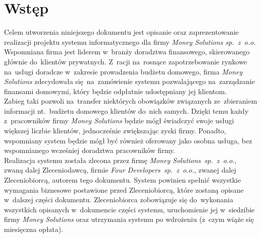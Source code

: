 \section{Wstęp}

Celem utworzenia niniejszego dokumentu jest opisanie oraz zaprezentowanie realizacji projektu systemu informatycznego dla firmy \emph{Money Solutions sp.~z~o.o.} Wspomniana firma jest liderem w~branży doradztwa finansowego, skierowanego głównie do~klientów prywatnych. Z~racji na~rosnące zapotrzebowanie rynkowe na~usługi doradcze w~zakresie prowadzenia budżetu domowego, firma \emph{Money Solutions} zdecydowała się na~zamówienie systemu pozwalającego na~zarządzanie finansami domowymi, który będzie odpłatnie udostępniany jej klientom.\\

Zabieg taki pozwoli na~transfer niektórych obowiązków związanych ze~zbieraniem informacji nt.~budżetu domowego klientów do~nich samych. Dzięki temu każdy z~pracowników firmy \emph{Money Solutions} będzie mógł świadczyć swoje usługi większej liczbie klientów, jednocześnie zwiększając zyski firmy. Ponadto, wspomniany system będzie mógł być również oferowany jako osobna usługa, bez wspomnianego wcześniej doradztwa pracowników firmy.\\

Realizacja systemu została zlecona przez firmę \emph{Money Solutions~sp.~z~o.o.}, zwaną dalej Zleceniodawcą, firmie \emph{Four Developers~sp.~z~o.o.}, zwanej dalej Zleceniobiorcą, autorem tego dokumentu. System powinien spełnić wszystkie wymagania biznesowe postawione przed Zleceniobiorcą, które zostaną opisane w~dalszej części dokumentu. Zleceniobiorca zobowiązuje się do~wykonania wszystkich opisanych w~dokumencie części systemu, uruchomienie jej w~siedzibie firmy \emph{Money Solutions} oraz utrzymania systemu po wdrożeniu (z~czym wiąże się miesięczna opłata). 
